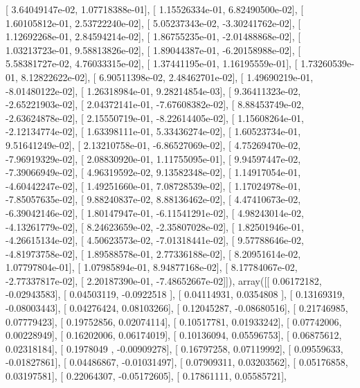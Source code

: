 \documentclass{article}
\begin{document}
       [  3.64049147e-02,   1.07718388e-01],
       [  1.15526334e-01,   6.82490500e-02],
       [  1.60105812e-01,   2.53722240e-02],
       [  5.05237343e-02,  -3.30241762e-02],
       [  1.12692268e-01,   2.84594214e-02],
       [  1.86755235e-01,  -2.01488868e-02],
       [  1.03213723e-01,   9.58813826e-02],
       [  1.89044387e-01,  -6.20158988e-02],
       [  5.58381727e-02,   4.76033315e-02],
       [  1.37441195e-01,   1.16195559e-01],
       [  1.73260539e-01,   8.12822622e-02],
       [  6.90511398e-02,   2.48462701e-02],
       [  1.49690219e-01,  -8.01480122e-02],
       [  1.26318984e-01,   9.28214854e-03],
       [  9.36411323e-02,  -2.65221903e-02],
       [  2.04372141e-01,  -7.67608382e-02],
       [  8.88453749e-02,  -2.63624878e-02],
       [  2.15550719e-01,  -8.22614405e-02],
       [  1.15608264e-01,  -2.12134774e-02],
       [  1.63398111e-01,   5.33436274e-02],
       [  1.60523734e-01,   9.51641249e-02],
       [  2.13210758e-01,  -6.86527069e-02],
       [  4.75269470e-02,  -7.96919329e-02],
       [  2.08830920e-01,   1.11755095e-01],
       [  9.94597447e-02,  -7.39066949e-02],
       [  4.96319592e-02,   9.13582348e-02],
       [  1.14917054e-01,  -4.60442247e-02],
       [  1.49251660e-01,   7.08728539e-02],
       [  1.17024978e-01,  -7.85057635e-02],
       [  9.88240837e-02,   8.88136462e-02],
       [  4.47410673e-02,  -6.39042146e-02],
       [  1.80147947e-01,  -6.11541291e-02],
       [  4.98243014e-02,  -4.13261779e-02],
       [  8.24623659e-02,  -2.35807028e-02],
       [  1.82501946e-01,  -4.26615134e-02],
       [  4.50623573e-02,  -7.01318441e-02],
       [  9.57788646e-02,  -4.81973758e-02],
       [  1.89588578e-01,   2.77336188e-02],
       [  8.20951614e-02,   1.07797804e-01],
       [  1.07985894e-01,   8.94877168e-02],
       [  8.17784067e-02,  -2.77337817e-02],
       [  2.20187390e-01,  -7.48652667e-02]]), array([[ 0.06172182, -0.02943583],
       [ 0.04503119, -0.0922518 ],
       [ 0.04114931,  0.0354808 ],
       [ 0.13169319, -0.08003443],
       [ 0.04276424,  0.08103266],
       [ 0.12045287, -0.08680516],
       [ 0.21746985,  0.07779423],
       [ 0.19752856,  0.02074114],
       [ 0.10517781,  0.01933242],
       [ 0.07742006,  0.00228949],
       [ 0.16202006,  0.06174019],
       [ 0.10136094,  0.05596753],
       [ 0.06875612,  0.02318184],
       [ 0.1978049 , -0.00909278],
       [ 0.16797258,  0.07119992],
       [ 0.09559633, -0.01827861],
       [ 0.04486867, -0.01031497],
       [ 0.07909311,  0.03203562],
       [ 0.05176858,  0.03197581],
       [ 0.22064307, -0.05172605],
       [ 0.17861111,  0.05585721],
\end{document}
